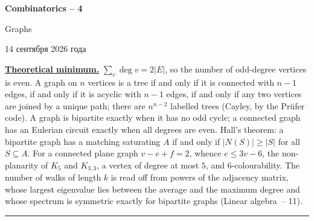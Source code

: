 \documentclass[11pt,a4paper]{article}
\newcommand{\head}[1]{\par\noindent\textbf{\underline{#1}}\quad}
\newcommand{\sheettitle}[4]{%
  \begin{center}
  {\huge\bfseries #1\par}\vspace{\dimexpr1.2em-2.5pt\relax}
  {\Large #2\par}\vspace{\dimexpr1em-0.4pt\relax}
  \if\relax\detokenize{#3}\relax\else{\Large #3\par}\vspace{\dimexpr1.15em-2pt\relax}\fi
  {\foreignlanguage{russian}{#4}\par}
  \end{center}\vspace{-1.5pt}}
\begin{document}
\sheettitle{Combinatorics -- 4}{Graphs}{Homework}{14 сентября 2026 года}

\head{Theoretical minimum.} $\sum_v\deg v=2|E|$, so the number of odd-degree vertices is even. A
graph on $n$ vertices is a tree if and only if it is connected with $n-1$ edges, if and only if
it is acyclic with $n-1$ edges, if and only if any two vertices are joined by a unique path; there
are $n^{n-2}$ labelled trees (Cayley, by the Pr\"ufer code). A graph is bipartite exactly when it
has no odd cycle; a connected graph has an Eulerian circuit exactly when all degrees are even.
Hall's theorem: a bipartite graph has a matching saturating $A$ if and only if
$|N(S)|\geqslant|S|$ for all $S\subseteq A$. For a connected plane graph $v-e+f=2$, whence
$e\leqslant3v-6$, the non-planarity of $K_5$ and $K_{3,3}$, a vertex of degree at most $5$, and
$6$-colourability. The number of walks of length $k$ is read off from powers of the adjacency
matrix, whose largest eigenvalue lies between the average and the maximum degree and whose
spectrum is symmetric exactly for bipartite graphs (Linear algebra~-- 11).

\par\vspace{-1pt}\noindent\rule{\linewidth}{0.4pt}\par\vspace{5pt}
\end{document}
